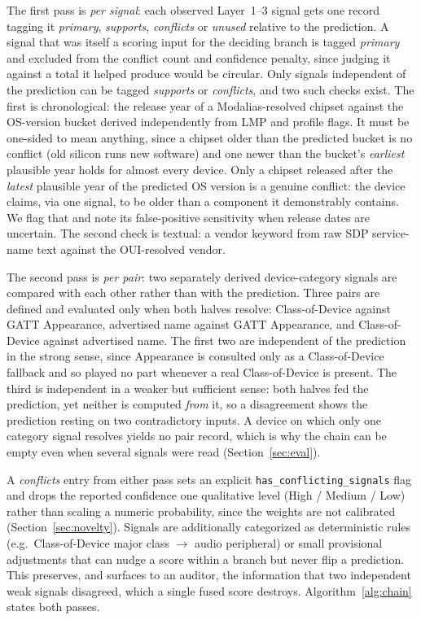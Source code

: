 \documentclass[conference]{IEEEtran}
\begin{document}
The first pass is \emph{per signal}: each observed Layer~1--3 signal gets one
record tagging it \emph{primary}, \emph{supports}, \emph{conflicts} or
\emph{unused} relative to the prediction. A signal that was itself a scoring
input for the deciding branch is tagged \emph{primary} and excluded from the
conflict count and confidence penalty, since judging it against a total it
helped produce would be circular. Only signals independent of the prediction
can be tagged \emph{supports} or \emph{conflicts}, and two such checks exist.
The first is chronological: the release year of a Modalias-resolved chipset
against the OS-version bucket derived independently from LMP and profile
flags. It must be one-sided to mean anything, since a chipset older than the
predicted bucket is no conflict (old silicon runs new software) and one newer
than the bucket's \emph{earliest} plausible year holds for almost every
device. Only a chipset released after the \emph{latest} plausible year of the
predicted OS version is a genuine conflict: the device claims, via one signal,
to be older than a component it demonstrably contains. We flag that and note
its false-positive sensitivity when release dates are uncertain. The second
check is textual: a vendor keyword from raw SDP service-name text against the
OUI-resolved vendor.

The second pass is \emph{per pair}: two separately derived device-category
signals are compared with each other rather than with the prediction. Three
pairs are defined and evaluated only when both halves resolve: Class-of-Device
against GATT Appearance, advertised name against GATT Appearance, and
Class-of-Device against advertised name. The first two are independent of the
prediction in the strong sense, since Appearance is consulted only as a
Class-of-Device fallback and so played no part whenever a real Class-of-Device
is present. The third is independent in a weaker but sufficient sense: both
halves fed the prediction, yet neither is computed \emph{from} it, so a
disagreement shows the prediction resting on two contradictory inputs. A
device on which only one category signal resolves yields no pair record,
which is why the chain can be empty even when several signals were read
(Section~\ref{sec:eval}).

A \emph{conflicts} entry from either pass sets an explicit
\texttt{has\_conflicting\_signals} flag and drops the reported confidence one
qualitative level (High / Medium / Low) rather than scaling a numeric
probability, since the weights are not calibrated
(Section~\ref{sec:novelty}). Signals are additionally categorized as
deterministic rules (e.g.\ Class-of-Device major class $\rightarrow$ audio
peripheral) or small provisional adjustments that can nudge a score within a
branch but never flip a prediction. This preserves, and surfaces to an
auditor, the information that two independent weak signals disagreed, which a
single fused score destroys. Algorithm~\ref{alg:chain} states both passes.
\end{document}
